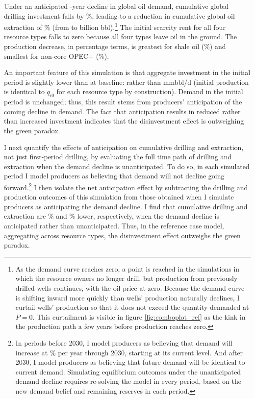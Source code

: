 \documentclass[12pt]{article}
\begin{document}
Under an anticipated \unskip-year decline in global oil demand, cumulative global drilling investment falls by \unskip\%, leading to a reduction in cumulative global oil extraction of \unskip\% (from to billion bbl).\footnote{As the demand curve reaches zero, a point is reached in the simulations in which the resource owners no longer drill, but production from previously drilled wells continues, with the oil price at zero. Because the demand curve is shifting inward more quickly than wells' production naturally declines, I curtail wells' production so that it does not exceed the quantity demanded at $P=0$. This curtailment is visible in figure \ref{fig:comboplot_ref} as the kink in the production path a few years before production reaches zero.} The initial scarcity rent for all four resource types falls to zero because all four types leave oil in the ground. The production decrease, in percentage terms, is greatest for shale oil (\unskip\%) and smallest for non-core OPEC+ (\unskip\%). 

An important feature of this simulation is that aggregate investment in the initial period is slightly lower than at baseline: rather than mmbbl/d (initial production is identical to $q_{i0}$ for each resource type by construction). Demand in the initial period is unchanged; thus, this result stems from producers' anticipation of the coming decline in demand. The fact that anticipation results in reduced rather than increased investment indicates that the disinvestment effect is outweighing the green paradox.

I next quantify the effects of anticipation on cumulative drilling and extraction, not just first-period drilling, by evaluating the full time path of drilling and extraction when the demand decline is unanticipated. To do so, in each simulated period I model producers as believing that demand will not decline going forward.\footnote{In periods before 2030, I model producers as believing that demand will increase at \unskip\% per year through 2030, starting at its current level. And after 2030, I model producers as believing that future demand will be identical to current demand. Simulating equilibrium outcomes under the unanticipated demand decline requires re-solving the model in every period, based on the new demand belief and remaining reserves in each period.} I then isolate the net anticipation effect by subtracting the drilling and production outcomes of this simulation from those obtained when I simulate producers as anticipating the demand decline. I find that cumulative drilling and extraction are \unskip\% and \unskip\% lower, respectively, when the demand decline is anticipated rather than unanticipated. Thus, in the reference case model, aggregating across resource types, the disinvestment effect outweighs the green paradox. 
\end{document}
